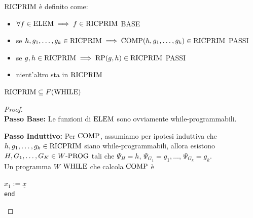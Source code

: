 $\text{RICPRIM}$ è definito come: 
\begin{itemize}
	\item $\forall f \in \text{ELEM} \implies f \in \text{RICPRIM}$ \hfill BASE
	\item se $h, g_1, \dots, g_k \in \text{RICPRIM} \implies \text{COMP}(h, g_1, \dots, g_k) \in \text{RICPRIM}$ \hfill PASSI
	\item se $g,h \in \text{RICPRIM} \implies \text{RP} (g,h) \in \text{RICPRIM}$ \hfill PASSI
	\item nient'altro sta in $\text{RICPRIM}$ \\
\end{itemize}

\begin{theor}
	$\text{RICPRIM} \subseteq F(\text{WHILE})$
\end{theor}
\begin{proof} \hspace{1cm} \\
	\textbf{Passo Base:} Le funzioni di $\text{ELEM}$ sono ovviamente while-programmabili.
	
	\textbf{Passo Induttivo:} Per $\text{COMP}$, assumiamo per ipotesi induttiva che $h,g_1, \dots, g_k \in \text{RICPRIM}$ siano while-programmabili, allora esistono $H, G_1, \dots, G_K \in W\text{-PROG}$ tali che $\Psi_H = h$, $\Psi_{G_1} = g_1, \dots$, $\Psi_{G_k} = g_k$.\\
	Un programma $W$ $\text{WHILE}$ che calcola $\text{COMP}$ è
	
	\begin{center}
		\begin{minipage}{0.85\textwidth}
			\begin{tcolorbox}[colback=white,sharp corners,boxrule=.3mm]
				\begin{algorithm}[H]
					\SetAlgoNoEnd
					$x_1 := \underline{x}$ \\
					\texttt{end}
				\end{algorithm}
			\end{tcolorbox}
		\end{minipage}
	\end{center}
	

\end{proof}
